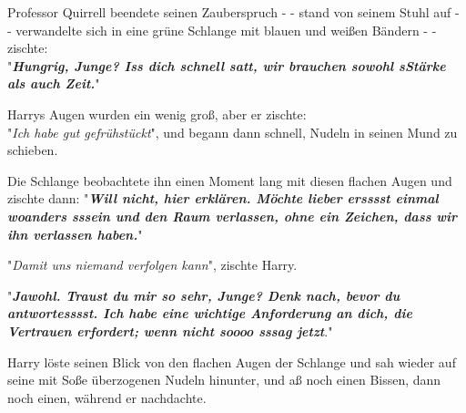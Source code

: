 {Professor Quirrell beendete seinen Zauberspruch - - stand von seinem Stuhl auf - - verwandelte sich in eine grüne Schlange mit blauen und weißen Bändern - - zischte:\\ "\textbf{\emph{Hungrig, Junge? Iss dich schnell satt, wir brauchen sowohl sStärke als auch Zeit.}}"

Harrys Augen wurden ein wenig groß, aber er zischte:\\ "\emph{Ich habe gut gefrühstückt}", und begann dann schnell, Nudeln in seinen Mund zu schieben.

Die Schlange beobachtete ihn einen Moment lang mit diesen flachen Augen und zischte dann: "\textbf{\emph{Will nicht, hier erklären. Möchte lieber ersssst einmal woanders sssein und den Raum verlassen, ohne ein Zeichen, dass wir ihn verlassen haben.}}"

"\emph{Damit uns niemand verfolgen kann}", zischte Harry.

"\textbf{\emph{Jawohl. Traust du mir so sehr, Junge? Denk nach, bevor du antwortesssst. Ich habe eine wichtige Anforderung an dich, die Vertrauen erfordert; wenn nicht soooo sssag jetzt}}."

Harry löste seinen Blick von den flachen Augen der Schlange und sah wieder auf seine mit Soße überzogenen Nudeln hinunter, und aß noch einen Bissen, dann noch einen, während er nachdachte.

}

